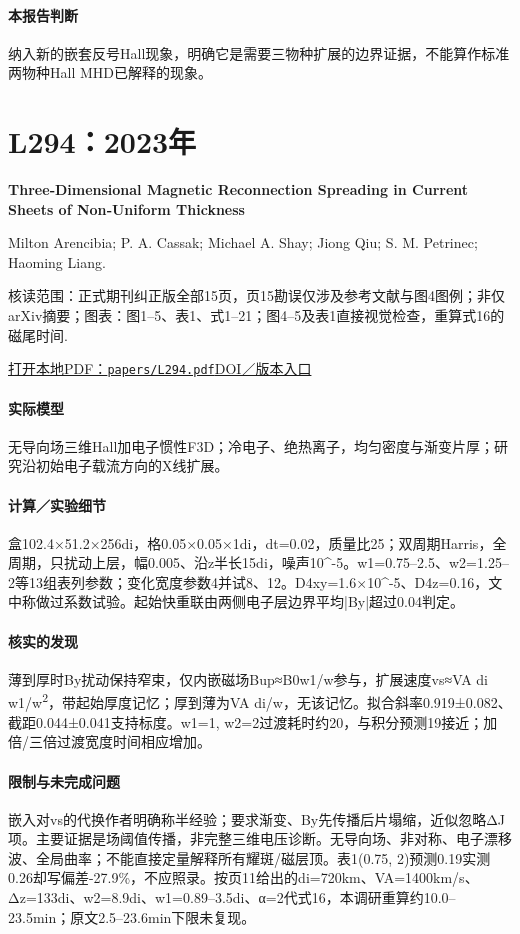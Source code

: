 \paragraph{本报告判断}纳入新的嵌套反号Hall现象，明确它是需要三物种扩展的边界证据，不能算作标准两物种Hall MHD已解释的现象。

\section{L294：2023年}\label{paper:L294}

\textbf{Three‐Dimensional Magnetic Reconnection Spreading in Current Sheets of Non‐Uniform Thickness}\citep{L294}\

Milton Arencibia;  P. A. Cassak;  Michael A. Shay;  Jiong Qiu;  S. M. Petrinec;  Haoming Liang.

\textsf{核读范围：}正式期刊纠正版全部15页，页15勘误仅涉及参考文献与图4图例；非仅arXiv摘要；\textsf{图表：}图1–5、表1、式1–21；图4–5及表1直接视觉检查，重算式16的磁尾时间.

\href{run:papers/L294.pdf}{打开本地PDF：\texttt{papers/L294.pdf}}\quad\href{https://doi.org/10.1029/2022ja030999}{DOI／版本入口}

\paragraph{实际模型}无导向场三维Hall加电子惯性F3D；冷电子、绝热离子，均匀密度与渐变片厚；研究沿初始电子载流方向的X线扩展。

\paragraph{计算／实验细节}盒102.4×51.2×256di，格0.05×0.05×1di，dt=0.02，质量比25；双周期Harris，全周期，只扰动上层，幅0.005、沿z半长15di，噪声10\textasciicircum{}-5。w1=0.75–2.5、w2=1.25–2等13组表列参数；变化宽度参数4并试8、12。D4xy=1.6×10\textasciicircum{}-5、D4z=0.16，文中称做过系数试验。起始快重联由两侧电子层边界平均|By|超过0.04判定。

\paragraph{核实的发现}薄到厚时By扰动保持窄束，仅内嵌磁场Bup≈B0w1/w参与，扩展速度vs≈VA di w1/w\textsuperscript{2}，带起始厚度记忆；厚到薄为VA di/w，无该记忆。拟合斜率0.919±0.082、截距0.044±0.041支持标度。w1=1, w2=2过渡耗时约20，与积分预测19接近；加倍/三倍过渡宽度时间相应增加。

\paragraph{限制与未完成问题}嵌入对vs的代换作者明确称半经验；要求渐变、By先传播后片塌缩，近似忽略ΔJ项。主要证据是场阈值传播，非完整三维电压诊断。无导向场、非对称、电子漂移波、全局曲率；不能直接定量解释所有耀斑/磁层顶。表1(0.75, 2)预测0.19实测0.26却写偏差-27.9\%，不应照录。按页11给出的di=720km、VA=1400km/s、Δz=133di、w2=8.9di、w1=0.89–3.5di、α=2代式16，本调研重算约10.0–23.5min；原文2.5–23.6min下限未复现。

